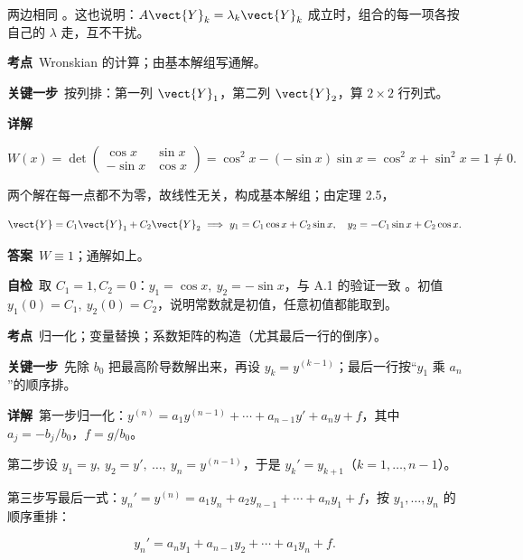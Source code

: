 \documentclass[11pt]{ctexart}
\renewcommand{\qbreak}{\needspace{0.26\textheight}}
\newcommand{\qpagebreak}{\needspace{0.92\textheight}}
\newcommand{\mat}[1]{\begin{pmatrix}#1\end{pmatrix}}
\begin{document}
两边相同 。这也说明：$A\vect{Y}_k=\lambda_k\vect{Y}_k$ 成立时，组合的每一项各按自己的 $\lambda$ 走，互不干扰。

\qpagebreak
{}
\label{c1:app:a5}

\qbreak
{}

\textbf{考点}\ Wronskian 的计算；由基本解组写通解。

\textbf{关键一步}\ 按列排：第一列 $\vect{Y}_1$，第二列 $\vect{Y}_2$，算 $2\times2$ 行列式。

\textbf{详解}\

\[
W(x)=\det\mat{\cos x & \sin x\\ -\sin x & \cos x}
=\cos^2x-(-\sin x)\sin x=\cos^2x+\sin^2x=1\neq0 .
\]

两个解在每一点都不为零，故线性无关，构成基本解组；由定理 2.5，

\[
\vect{Y}=C_1\vect{Y}_1+C_2\vect{Y}_2
\ \Longrightarrow\
y_1=C_1\cos x+C_2\sin x,\quad y_2=-C_1\sin x+C_2\cos x .
\]

\textbf{答案}\ $W\equiv1$；通解如上。

\textbf{自检}\ 取 $C_1=1,C_2=0$：$y_1=\cos x,\ y_2=-\sin x$，与 A.1 的验证一致 。初值 $y_1(0)=C_1,\ y_2(0)=C_2$，说明常数就是初值，任意初值都能取到。

\qpagebreak
{}
\label{c1:app:a6}

\qbreak
{}

\textbf{考点}\ 归一化；变量替换；系数矩阵的构造（尤其最后一行的倒序）。

\textbf{关键一步}\ 先除 $b_0$ 把最高阶导数解出来，再设 $y_k=y^{(k-1)}$；最后一行按“$y_1$ 乘 $a_n$”的顺序排。

\textbf{详解}\ 第一步归一化：$y^{(n)}=a_1y^{(n-1)}+\cdots+a_{n-1}y'+a_ny+f$，其中 $a_j=-b_j/b_0$，$f=g/b_0$。

第二步设 $y_1=y,\ y_2=y',\ \dots,\ y_n=y^{(n-1)}$，于是 $y_k'=y_{k+1}$（$k=1,\dots,n-1$）。

第三步写最后一式：$y_n'=y^{(n)}=a_1y_n+a_2y_{n-1}+\cdots+a_ny_1+f$，按 $y_1,\dots,y_n$ 的顺序重排：

\[
y_n'=a_ny_1+a_{n-1}y_2+\cdots+a_1y_n+f .
\]
\end{document}
